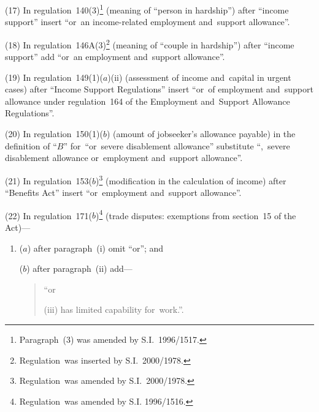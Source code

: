\documentclass[12pt,a4paper]{article}
\begin{document}
(17) In regulation~140(3)\footnote{Paragraph~(3) was amended by S.I.~1996/1517.} (meaning of “person in hardship”) after “income support” insert “or~an income-related employment and~support allowance”.

(18) In regulation~146A(3)\footnote{Regulation~was inserted by S.I.~2000/1978.} (meaning of “couple in hardship”) after “income support” add “or~an employment and~support allowance”.

(19) In regulation~149(1)($a$)(ii)  (assessment of income and~capital in urgent cases) after “Income Support Regulations” insert “or~of employment and~support allowance under regulation~164 of the Employment and~Support Allowance Regulations”.

(20) In regulation~150(1)($b$)  (amount of jobseeker’s allowance payable) in the definition of “$B$” for~“or~severe disablement allowance” substitute “,~severe disablement allowance or~employment and~support allowance”.

(21) In regulation~153($b$)\footnote{Regulation~was amended by S.I.~2000/1978.} (modification in the calculation of income) after “Benefits Act” insert “or~employment and~support allowance”.

(22) In regulation~171($b$)\footnote{Regulation~was amended by S.I. 1996/1516.} (trade disputes: exemptions from section~15 of the Act)—
\begin{enumerate}\item[]
($a$) after paragraph~(i)  omit “or”; and

($b$) after paragraph~(ii)  add—
\begin{quotation}
“or

(iii) has limited capability for~work.”.
\end{quotation}
\end{enumerate}
\end{document}

